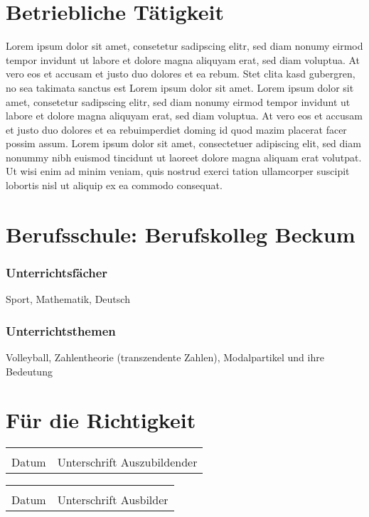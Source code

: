 \documentclass[11pt,a4paper]{article}
\author{Gustav Tester} %
\begin{document}
\section*{Betriebliche Tätigkeit} %
Lorem ipsum dolor sit amet, consetetur sadipscing elitr, sed diam nonumy eirmod tempor invidunt ut labore et dolore magna aliquyam erat, sed diam voluptua. At vero eos et accusam et justo duo dolores et ea rebum. Stet clita kasd gubergren, no sea takimata sanctus est Lorem ipsum dolor sit amet. Lorem ipsum dolor sit amet, consetetur sadipscing elitr, sed diam nonumy eirmod tempor invidunt ut labore et dolore magna aliquyam erat, sed diam voluptua. At vero eos et accusam et justo duo dolores et ea rebuimperdiet doming id quod mazim placerat facer possim assum. Lorem ipsum dolor sit amet, consectetuer adipiscing elit, sed diam nonummy nibh euismod tincidunt ut laoreet dolore magna aliquam erat volutpat. Ut wisi enim ad minim veniam, quis nostrud exerci tation ullamcorper suscipit lobortis nisl ut aliquip ex ea commodo consequat.


\section*{Berufsschule: Berufskolleg Beckum}
\begin{multicols}{2}
	\subsubsection*{Unterrichtsfächer}
	Sport, Mathematik, Deutsch
	\columnbreak
	\subsubsection*{Unterrichtsthemen}
	Volleyball, Zahlentheorie (transzendente Zahlen), Modalpartikel und ihre Bedeutung
\end{multicols}

\vfill
\section*{Für die Richtigkeit}
\vspace{.5cm}
\begin{multicols}{2}
	\begin{tabular}{@{}p{2cm}p{5cm}@{}}
		\hrulefill & \hrulefill\\
		Datum & Unterschrift Auszubildender
	\end{tabular}
	\vfill\null
	\columnbreak
	\begin{tabular}{@{}p{2cm}p{5cm}@{}}
		\hrulefill & \hrulefill\\
		Datum & Unterschrift Ausbilder
	\end{tabular}
\end{multicols}
	
\end{document}
